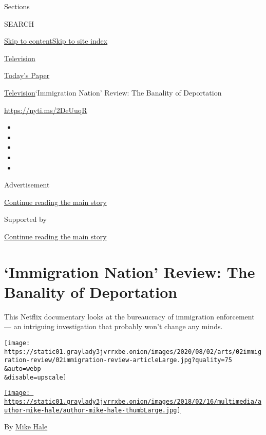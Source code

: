 Sections

SEARCH

\protect\hyperlink{site-content}{Skip to
content}\protect\hyperlink{site-index}{Skip to site index}

\href{https://www.nytimes3xbfgragh.onion/section/arts/television}{Television}

\href{https://myaccount.nytimes3xbfgragh.onion/auth/login?response_type=cookie\&client_id=vi}{}

\href{https://www.nytimes3xbfgragh.onion/section/todayspaper}{Today's
Paper}

\href{/section/arts/television}{Television}\textbar{}`Immigration
Nation' Review: The Banality of Deportation

\url{https://nyti.ms/2DeUuqR}

\begin{itemize}
\item
\item
\item
\item
\item
\end{itemize}

Advertisement

\protect\hyperlink{after-top}{Continue reading the main story}

Supported by

\protect\hyperlink{after-sponsor}{Continue reading the main story}

\hypertarget{immigration-nation-review-the-banality-of-deportation}{%
\section{`Immigration Nation' Review: The Banality of
Deportation}\label{immigration-nation-review-the-banality-of-deportation}}

This Netflix documentary looks at the bureaucracy of immigration
enforcement --- an intriguing investigation that probably won't change
any minds.

\texttt{[image: https://static01.graylady3jvrrxbe.onion/images/2020/08/02/arts/02immigration-review/02immigration-review-articleLarge.jpg?quality=75\\\&auto=webp\\\&disable=upscale]}

\href{https://www.nytimes3xbfgragh.onion/by/mike-hale}{\texttt{[image: https://static01.graylady3jvrrxbe.onion/images/2018/02/16/multimedia/author-mike-hale/author-mike-hale-thumbLarge.jpg]}}

By \href{https://www.nytimes3xbfgragh.onion/by/mike-hale}{Mike Hale}

